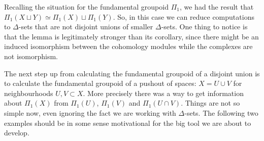 \documentclass{tufte-handout}
\theoremstyle{definition}
\begin{document}
Recalling the situation for the fundamental groupoid $\Pi_1$, we had the result that
$\Pi_1(X\sqcup Y) \simeq \Pi_1(X)\sqcup \Pi_1(Y)$. So, in this case we can reduce computations
to $\Delta$-sets that are not disjoint unions of smaller $\Delta$-sets. One thing to notice 
is that the lemma is legitimately stronger than its corollary, since there might be an induced
isomorphism between the cohomology modules while the complexes are not isomorphism.

The next step up from calculating the fundamental groupoid of a disjoint union is to calculate
the fundamental groupoid of a pushout of spaces: $X = U\cup V$ for neighbourhoods $U,V\subset X$.
More precisely there was a way to get information about $\Pi_1(X)$ from $\Pi_1(U)$, $\Pi_1(V)$ 
and $\Pi_1(U\cap V)$. Things are not so simple now, even ignoring the fact we are working 
with $\Delta$-sets. The following two examples should be in some sense motivational for the 
big tool we are about to develop. 
\end{document}
